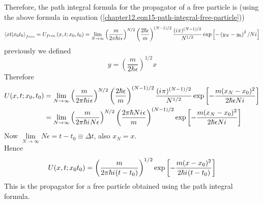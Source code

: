	Therefore, the path integral formula for the propagator of a free particle is (using the above formula in equation (\ref{chapter12.eqn15-path-integral-free-particle}))
	\begin{align}
		\braket{x t}{x_0 t_0}_{free} = U_{free}\left(x, t; x_0, t_0\right) = \lim\limits_{N\rightarrow \infty} \left(\frac{m}{2\pi \hbar {i\mkern1mu} \epsilon}\right)^{N/2} \left(\frac{2\hbar\epsilon}{m}\right)^{(N-1)/2}  \frac{({i\mkern1mu} \pi)^{(N-1)/2}}{N^{1/2}} \exp\left[-\left(y_N - y_0\right)^2 / N{i\mkern1mu}
		\right]
	\end{align}
	previously we defined
	\begin{equation}
		y = \left(\frac{m}{2\hbar \epsilon}\right)^{1/2} x
	\end{equation}
	Therefore
	\begin{align*}
		U(x, t; x_0, t_0) 
		&= \lim\limits_{N\rightarrow \infty} \left(\frac{m}{2\pi\hbar{i\mkern1mu}\epsilon}\right)^{N/2} \left(\frac{2\hbar \epsilon}{m}\right)^{(N-1)/2} \frac{({i\mkern1mu} \pi)^{(N-1)/2}}{N^{1/2}} \exp \left[-\frac{m(x_N - x_0)^2}{2\hbar \epsilon N {i\mkern1mu}}\right] \\
		&= \lim\limits_{N\rightarrow \infty} \left(\frac{m}{2\pi\hbar{i\mkern1mu} N \epsilon}\right)^{N/2} \left(\frac{2\pi\hbar N {i\mkern1mu} \epsilon}{m}\right)^{(N-1)/2} \exp \left[-\frac{m(x_N - x_0)^2}{2\hbar \epsilon N {i\mkern1mu}}\right]
	\end{align*}
	Now $\lim\limits_{N\rightarrow \infty} N\epsilon = t-t_0 \equiv \Delta t$,
	also $x_N = x$.\\
	
	Hence
	\begin{equation}
		U(x,t; x_0 t_0) = \left(\frac{m}{2\pi \hbar {i\mkern1mu} (t-t_0)}\right)^{1/2} \exp\left[-\frac{m(x-x_0)^2}{2\hbar{i\mkern1mu} (t-t_0)}\right]
		\label{chapter12.eqn18-path-integral-free-particle}
	\end{equation}
	This is the propagator for a free particle obtained using the path integral formula.
	
